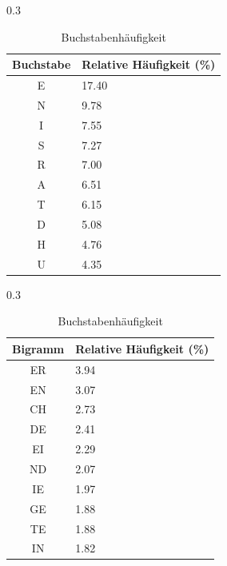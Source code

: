 \begin{table}[H]
	\centering
	\begin{subtable}[t]{0.3\textwidth}
		\centering
		\begin{tabular}{cp{1.9cm}}
			\textbf{Buchstabe} & Relative Häufigkeit (\%) \\ \midrule
			E                  & 17.40                    \\
			N                  & 9.78                     \\
			I                  & 7.55                     \\
			S                  & 7.27                     \\
			R                  & 7.00                     \\
			A                  & 6.51                     \\
			T                  & 6.15                     \\
			D                  & 5.08                     \\
			H                  & 4.76                     \\
			U                  & 4.35                     \\
		\end{tabular}
		\caption{Buchstabenhäufigkeit}
	\end{subtable}
	\hspace{0.5cm}
	\begin{subtable}[t]{0.3\textwidth}
		\centering
		\begin{tabular}{cp{1.9cm}}
			\textbf{Bigramm} & Relative Häufigkeit (\%) \\ \midrule
			ER               & 3.94                     \\
			EN               & 3.07                     \\
			CH               & 2.73                     \\
			DE               & 2.41                     \\
			EI               & 2.29                     \\
			ND               & 2.07                     \\
			IE               & 1.97                     \\
			GE               & 1.88                     \\
			TE               & 1.88                     \\
			IN               & 1.82                     \\

\end{tabular}
\end{subtable}
\end{table}

